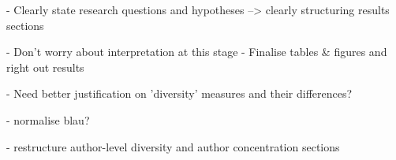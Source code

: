 - Clearly state research questions and hypotheses
--> clearly structuring results sections


- Don't worry about interpretation at this stage
- Finalise tables & figures and right out results


- Need better justification on 'diversity' measures and their differences?

- normalise blau?

- restructure author-level diversity and author concentration sections